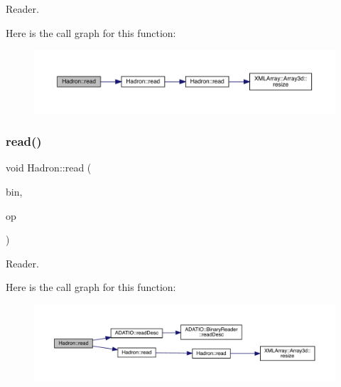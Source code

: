 Reader. 

Here is the call graph for this function\+:
\nopagebreak
\begin{figure}[H]
\begin{center}
\leavevmode
\includegraphics[width=350pt]{d1/daf/namespaceHadron_a3b1ec7d213815eedf06fcd0e518eb5d3_cgraph}
\end{center}
\end{figure}
\mbox{\label{namespaceHadron_afc23e5e61669cc277e94a613ee812b0f}} 
\subsubsection{\texorpdfstring{read()}{read()}\hspace{0.1cm}{\footnotesize\ttfamily [94/94]}}
{\footnotesize\ttfamily void Hadron\+::read (\begin{DoxyParamCaption}\item[{\mbox{\hyperlink{classADATIO_1_1BinaryReader}{Binary\+Reader}} \&}]{bin,  }\item[{\mbox{\hyperlink{structHadron_1_1KeySingleHadronQuarkFlavorColor__t}{Key\+Single\+Hadron\+Quark\+Flavor\+Color\+\_\+t}} \&}]{op }\end{DoxyParamCaption})}



Reader. 

Here is the call graph for this function\+:
\nopagebreak
\begin{figure}[H]
\begin{center}
\leavevmode
\includegraphics[width=350pt]{d1/daf/namespaceHadron_afc23e5e61669cc277e94a613ee812b0f_cgraph}
\end{center}
\end{figure}
\mbox{\label{namespaceHadron_a8a4e39ac150585731d18fb970ec8a1bd}} 
